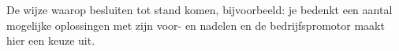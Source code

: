 De wijze waarop besluiten tot stand komen, bijvoorbeeld: je bedenkt een aantal mogelijke oplossingen met zijn voor- en nadelen en de bedrijfspromotor maakt hier een keuze uit.